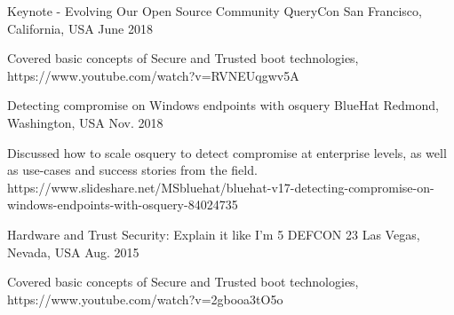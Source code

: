 


\begin{cventries}


\cventry
{Keynote - Evolving Our Open Source Community} %
{QueryCon} %
{San Francisco, California, USA} %
{June 2018} %
{ %
\begin{cvitems}
\item {Covered basic concepts of Secure and Trusted boot technologies, https://www.youtube.com/watch?v=RVNEUqgwv5A}
\end{cvitems}
}


\cventry
{Detecting compromise on Windows endpoints with osquery} %
{BlueHat} %
{Redmond, Washington, USA} %
{Nov. 2018} %
{ %
\begin{cvitems}
\item {Discussed how to scale osquery to detect compromise at enterprise levels, as well as use-cases and success stories from the field. https://www.slideshare.net/MSbluehat/bluehat-v17-detecting-compromise-on-windows-endpoints-with-osquery-84024735}
\end{cvitems}
}


\cventry
{Hardware and Trust Security: Explain it like I’m 5} %
{DEFCON 23} %
{Las Vegas, Nevada, USA} %
{Aug. 2015} %
{ %
\begin{cvitems}
\item {Covered basic concepts of Secure and Trusted boot technologies, https://www.youtube.com/watch?v=2gbooa3tO5o}
\end{cvitems}
}


\end{cventries}